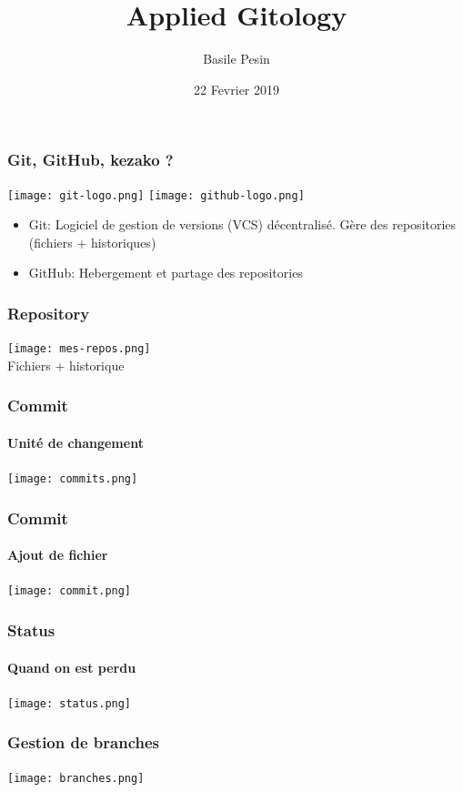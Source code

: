 \documentclass[aspectratio=169]{beamer}
\title{Applied Gitology}
\date{22 Fevrier 2019}
\author{Basile Pesin}
\begin{document}
\begin{frame}
\titlepage
\end{frame}

\begin{frame}
  \frametitle{Git, GitHub, kezako ?}
  \begin{center}
    \texttt{[image: git-logo.png]}\hspace{.1\paperwidth}
    \texttt{[image: github-logo.png]}
  \end{center}
  \begin{itemize}
  \item Git: Logiciel de gestion de versions (VCS) décentralisé. Gère des repositories (fichiers + historiques)
  \item GitHub: Hebergement et partage des repositories
  \end{itemize}
\end{frame}

\begin{frame}
  \frametitle{Repository}
  \begin{center}
      \texttt{[image: mes-repos.png]}\\\vspace{.02\paperheight}
    Fichiers + historique
  \end{center}
\end{frame}

\begin{frame}
  \frametitle{Commit}
  \framesubtitle{Unité de changement}
  \begin{center}
    \texttt{[image: commits.png]}
  \end{center}
\end{frame}

\begin{frame}
  \frametitle{Commit}
  \framesubtitle{Ajout de fichier}
  \begin{center}
    \texttt{[image: commit.png]}
  \end{center}
\end{frame}

\begin{frame}
  \frametitle{Status}
  \framesubtitle{Quand on est perdu}
  \begin{center}
    \texttt{[image: status.png]}
  \end{center}
\end{frame}

\begin{frame}
  \frametitle{Gestion de branches}
  \begin{center}
    \texttt{[image: branches.png]}
  \end{center}
\end{frame}
\end{document}

